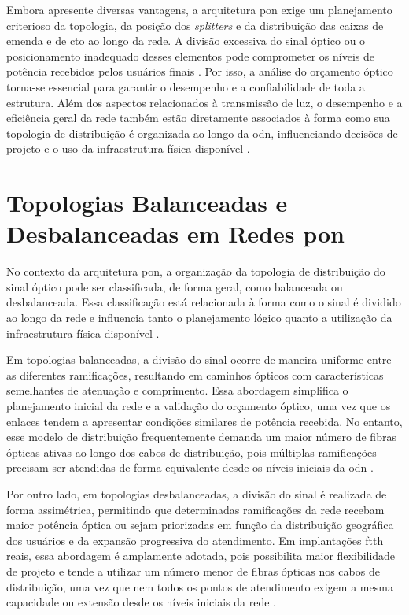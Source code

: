 Embora apresente diversas vantagens, a arquitetura \gls{pon} exige um planejamento criterioso da topologia, da posição dos \textit{splitters} e da distribuição das caixas de emenda e de \gls{cto} ao longo da rede. A divisão excessiva do sinal óptico ou o posicionamento inadequado desses elementos pode comprometer os níveis de potência recebidos pelos usuários finais \cite{keiser2011pon}. Por isso, a análise do orçamento óptico torna-se essencial para garantir o desempenho e a confiabilidade de toda a estrutura. Além dos aspectos relacionados à transmissão de luz, o desempenho e a eficiência geral da rede também estão diretamente associados à forma como sua topologia de distribuição é organizada ao longo da \gls{odn}, influenciando decisões de projeto e o uso da infraestrutura física disponível \cite{keiser2011pon,oliviero2014fiber}.

\section{Topologias Balanceadas e Desbalanceadas em Redes \gls{pon}}

No contexto da arquitetura \gls{pon}, a organização da topologia de distribuição do sinal óptico pode ser classificada, de forma geral, como balanceada ou desbalanceada. Essa classificação está relacionada à forma como o sinal é dividido ao longo da rede e influencia tanto o planejamento lógico quanto a utilização da infraestrutura física disponível \cite{keiser2011pon,itutg9841}.

Em topologias balanceadas, a divisão do sinal ocorre de maneira uniforme entre as diferentes ramificações, resultando em caminhos ópticos com características semelhantes de atenuação e comprimento. Essa abordagem simplifica o planejamento inicial da rede e a validação do orçamento óptico, uma vez que os enlaces tendem a apresentar condições similares de potência recebida. No entanto, esse modelo de distribuição frequentemente demanda um maior número de fibras ópticas ativas ao longo dos cabos de distribuição, pois múltiplas ramificações precisam ser atendidas de forma equivalente desde os níveis iniciais da \gls{odn} \cite{keiser2011pon,oliviero2014fiber}.

Por outro lado, em topologias desbalanceadas, a divisão do sinal é realizada de forma assimétrica, permitindo que determinadas ramificações da rede recebam maior potência óptica ou sejam priorizadas em função da distribuição geográfica dos usuários e da expansão progressiva do atendimento. Em implantações \gls{ftth} reais, essa abordagem é amplamente adotada, pois possibilita maior flexibilidade de projeto e tende a utilizar um número menor de fibras ópticas nos cabos de distribuição, uma vez que nem todos os pontos de atendimento exigem a mesma capacidade ou extensão desde os níveis iniciais da rede \cite{keiser2011pon}.

